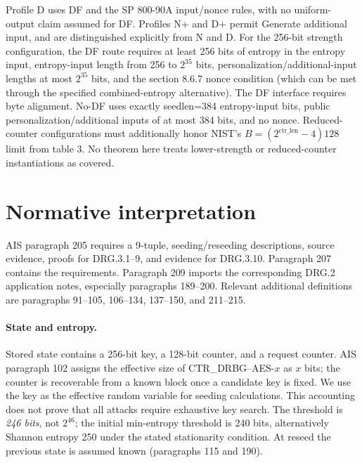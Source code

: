 \documentclass[11 pt,a 4 paper]{article}
\begin{document}
Profile D uses DF and the SP 800-90A input/nonce rules, with no uniform-output claim assumed for DF. Profiles N+ and D+ permit Generate additional input, and are distinguished explicitly from N and D. For the 256-bit strength configuration, the DF route requires at least 256 bits of entropy in the entropy input, entropy-input length from 256 to $2^{35}$ bits, personalization/additional-input lengths at most $2^{35}$ bits, and the section 8.6.7 nonce condition (which can be met through the specified combined-entropy alternative). The DF interface requires byte alignment. No-DF uses exactly seedlen=384 entropy-input bits, public personalization/additional inputs of at most 384 bits, and no nonce. Reduced-counter configurations must additionally honor NIST's $ B=(2^{\text{ctr\_len}}-4)128$ limit from table 3. No theorem here treats lower-strength or reduced-counter instantiations as covered.

\section{Normative interpretation}
AIS paragraph 205 requires a 9-tuple, seeding/reseeding descriptions, source evidence, proofs for DRG.3.1--9, and evidence for DRG.3.10. Paragraph 207 contains the requirements. Paragraph 209 imports the corresponding DRG.2 application notes, especially paragraphs 189--200. Relevant additional definitions are paragraphs 91--105, 106--134, 137--150, and 211--215.

\paragraph{State and entropy.} Stored state contains a 256-bit key, a 128-bit counter, and a request counter. AIS paragraph 102 assigns the effective size of CTR\_DRBG--AES-$ x $ as $ x $ bits; the counter is recoverable from a known block once a candidate key is fixed. We use the key as the effective random variable for seeding calculations. This accounting does not prove that all attacks require exhaustive key search. The threshold is \emph{246 bits}, not $2^{46}$; the initial min-entropy threshold is 240 bits, alternatively Shannon entropy 250 under the stated stationarity condition. At reseed the previous state is assumed known (paragraphs 115 and 190).
\end{document}
